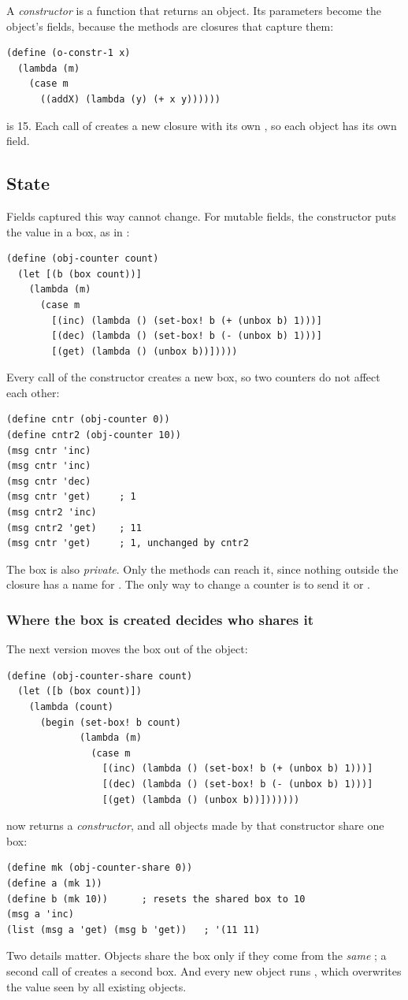 A \emph{constructor} is a function that returns an object. Its parameters become the object's fields, because the methods are closures that capture them:
\begin{lstlisting}
(define (o-constr-1 x)
  (lambda (m)
    (case m
      ((addX) (lambda (y) (+ x y))))))
\end{lstlisting}
 is 15. Each call of  creates a new closure with its own , so each object has its own field.

\subsection{State}

Fields captured this way cannot change. For mutable fields, the constructor puts the value in a box, as in :
\begin{lstlisting}
(define (obj-counter count)
  (let [(b (box count))]
    (lambda (m)
      (case m
        [(inc) (lambda () (set-box! b (+ (unbox b) 1)))]
        [(dec) (lambda () (set-box! b (- (unbox b) 1)))]
        [(get) (lambda () (unbox b))]))))
\end{lstlisting}
Every call of the constructor creates a new box, so two counters do not affect each other:
\begin{lstlisting}[style=repl]
(define cntr (obj-counter 0))
(define cntr2 (obj-counter 10))
(msg cntr 'inc)
(msg cntr 'inc)
(msg cntr 'dec)
(msg cntr 'get)     ; 1
(msg cntr2 'inc)
(msg cntr2 'get)    ; 11
(msg cntr 'get)     ; 1, unchanged by cntr2
\end{lstlisting}
The box is also \emph{private}. Only the methods can reach it, since nothing outside the closure has a name for . The only way to change a counter is to send it  or .

\subsubsection{Where the box is created decides who shares it} The next version moves the box out of the object:
\begin{lstlisting}
(define (obj-counter-share count)
  (let ([b (box count)])
    (lambda (count)
      (begin (set-box! b count)
             (lambda (m)
               (case m
                 [(inc) (lambda () (set-box! b (+ (unbox b) 1)))]
                 [(dec) (lambda () (set-box! b (- (unbox b) 1)))]
                 [(get) (lambda () (unbox b))]))))))
\end{lstlisting}
 now returns a \emph{constructor}, and all objects made by that constructor share one box:
\begin{lstlisting}[style=repl]
(define mk (obj-counter-share 0))
(define a (mk 1))
(define b (mk 10))      ; resets the shared box to 10
(msg a 'inc)
(list (msg a 'get) (msg b 'get))   ; '(11 11)
\end{lstlisting}
Two details matter. Objects share the box only if they come from the \emph{same} ; a second call of  creates a second box. And every new object runs , which overwrites the value seen by all existing objects.

